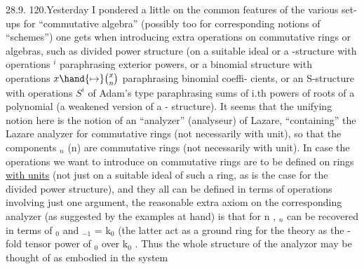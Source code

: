 
28.9.
120.\quad Yesterday I pondered a little on the common features of the various
set-ups for ``commutative algebra'' (possibly too for corresponding notions
of ``schemes'') one gets when introducing extra operations on commutative
rings or algebras, such as divided power structure (on a suitable ideal\hand{),}
or a \hand{$\lambda$}-structure with operations \hand{$\lambda$}$^i$ paraphrasing exterior powers, or a
binomial structure with operations $x\hand{\mapsto}\binom{x}{n}$ paraphrasing binomial coeffi-%
cients, or an S-structure with operations $S^i$ of Adam's type paraphrasing
sums of i.th powers of roots of a polynomial (a weakened version of a \hand{$\lambda$}-%
structure). It seems that the unifying notion here is the notion of an
``analyzer'' (analyseur) of Lazare, ``containing'' the Lazare analyzer for
commutative rings (not necessarily with unit), so that the components
 \hand{$\Omega$}$_n$ (n\hand{$\geqslant$}) are commutative rings (not necessarily with unit). In case
the \allowbreak{} operations we want to introduce on commutative rings are
to be defined on rings \uline{with units} (not just on a suitable ideal of such
a ring, as is the case for the divided power structure), and they all
can be defined in terms of operations involving just one argument, the
reasonable extra axiom on  the corresponding analyzer (as suggested by
the examples at hand) is that for n \hand{$\geqslant$} , \hand{$\Omega$}$_n$ can be recovered in terms
of \hand{$\Omega$}$_0$ and \hand{$\Omega$}$_{-1}$ = k$_0$ (the latter act as a ground ring for the theory\hand{)}
as the -fold tensor power of \hand{$\Omega$}$_0$ over k$_0$ . Thus the whole structure of
 the analyzor may be thought of as embodied in the system  
